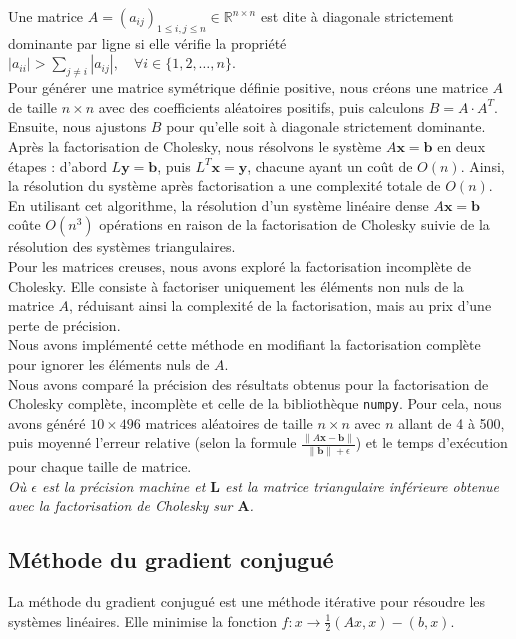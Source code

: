 \documentclass{article}
\begin{document}
Une matrice \( A = (a_{ij})_{1 \leq i,j \leq n} \in \mathbb{R}^{n \times n} \) est dite à diagonale strictement dominante par ligne si elle vérifie la propriété \( |a_{ii}| > \sum_{j \neq i} |a_{ij}|, \quad \forall i \in \{1,2, \dots, n\} \).\\
 Pour générer une matrice symétrique définie positive, nous créons une matrice \( A \) de taille \( n \times n \) avec des coefficients aléatoires positifs, puis calculons \( B = A \cdot A^T \). Ensuite, nous ajustons \( B \) pour qu'elle soit à diagonale strictement dominante.
Après la factorisation de Cholesky, nous résolvons le système \(A \mathbf{x} = \mathbf{b}\) en deux étapes : d'abord \(L \mathbf{y} = \mathbf{b}\), puis \(L^T \mathbf{x} = \mathbf{y}\), chacune ayant un coût de \(O(n)\). Ainsi, la résolution du système après factorisation a une complexité totale de \(O(n)\). En utilisant cet algorithme, la résolution d'un système linéaire dense \(A \mathbf{x} = \mathbf{b}\) coûte \(O(n^3)\) opérations en raison de la factorisation de Cholesky suivie de la résolution des systèmes triangulaires. \\

Pour les matrices creuses, nous avons exploré la factorisation incomplète de Cholesky. Elle consiste à factoriser uniquement les éléments non nuls de la matrice \(A\), réduisant ainsi la complexité de la factorisation, mais au prix d'une perte de précision.\\
Nous avons implémenté cette méthode en modifiant la factorisation complète pour ignorer les éléments nuls de \(A\).\\
Nous avons comparé la précision des résultats obtenus pour la factorisation de Cholesky complète, incomplète et celle de la bibliothèque \texttt{numpy}. Pour cela, nous avons généré \(10 \times 496\) matrices aléatoires de taille \(n \times n\) avec \(n\) allant de 4 à 500, puis moyenné l'erreur relative (selon la formule \(\frac{\| A \mathbf{x} - \mathbf{b} \|}{\| \mathbf{b} \| + \epsilon}\)) et le temps d'exécution pour chaque taille de matrice.\\
\textit{Où \(\epsilon\) est la précision machine et \(\mathbf{L}\) est la matrice triangulaire inférieure obtenue avec la factorisation de Cholesky sur \(\mathbf{A}\).}
\subsection{Méthode du gradient conjugué }
\label{DEC_EXP}
La méthode du gradient conjugué est une méthode itérative pour résoudre les systèmes linéaires. Elle minimise la fonction \( f : x \rightarrow \frac{1}{2}(Ax,x) - (b,x) \).
\end{document}
